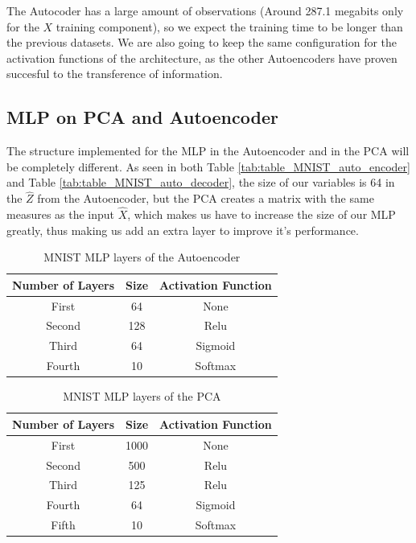 \documentclass[12pt]{report}
\begin{document}
The Autocoder has a large amount of observations (Around 287.1 megabits only for the $X$ training component), so we expect the training time to be longer than the previous datasets. We are also going to keep the same configuration for the activation functions of the architecture, as the other Autoencoders  have proven succesful to the transference of information.

\subsection{MLP on PCA and Autoencoder}

The structure implemented for the MLP in the Autoencoder and in the PCA will be completely different. As seen in both Table \ref{tab:table_MNIST_auto_encoder} and Table \ref{tab:table_MNIST_auto_decoder}, the size of our variables is 64 in the $\hat{Z}$ from the Autoencoder, but the PCA creates a matrix with the same measures as the input $\hat{X}$, which makes us have to increase the size of our MLP greatly, thus making us add an extra layer to improve it's performance.
\par	

\begin{table}[H]
	\caption{MNIST MLP layers of the Autoencoder}
	\begin{center}
		\label{tab:table_MNIST_MLP_auto}
		\begin{tabular}{c|c|c} %
			\textbf{Number of Layers} & \textbf{Size} & \textbf{Activation Function} \\
			\hline
			First & 64 & None\\
			Second & 128 & Relu\\
			Third & 64  & Sigmoid\\
			Fourth & 10 & Softmax\\
		\end{tabular}
	\end{center}
\end{table}

\begin{table}[H]
	\caption{MNIST MLP layers of the PCA}
	\begin{center}
		\label{tab:table_MNIST_MLP_pca}
		\begin{tabular}{c|c|c} %
			\textbf{Number of Layers} & \textbf{Size} & \textbf{Activation Function} \\
			\hline
			First & 1000 & None\\
			Second & 500 & Relu\\
			Third & 125  & Relu\\
			Fourth & 64 & Sigmoid\\
			Fifth & 10 & Softmax \\
		\end{tabular}
	\end{center}
\end{table}
\end{document}
